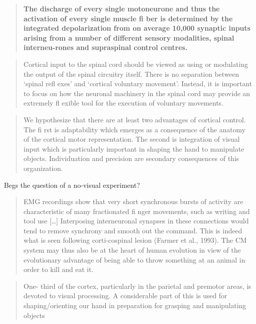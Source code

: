 \documentclass[../main.tex]{subfiles}
\begin{document}
{{{\begin{quote}
\textbf{The discharge of every single motoneurone and thus the
activation of every single muscle fi ber is determined by the integrated
depolarization from on average 10,000 synaptic inputs arising from a
number of different sensory modalities, spinal interneu-rones and
supraspinal control centres.}
\end{quote}

\begin{quote}
Cortical input to the spinal cord should be viewed as using or
modulating the output of the spinal circuitry itself. There is no
separation between `spinal refl exes' and `cortical voluntary movement'.
Instead, it is important to focus on how the neuronal machinery in the
spinal cord may provide an extremely fl exible tool for the execution of
voluntary movements.
\end{quote}

\begin{quote} 
  We hypothesize that there are at least two advantages of cortical control. The fi rst is adaptability which emerges as a consequence of the anatomy of the cortical motor representation. The second is integration of visual input which is particularly important in shaping the hand to manipulate objects. Individuation and precision are secondary consequences of this organization.
\end{quote}

Begs the question of a no-visual experiment?

\begin{quote}
  EMG recordings show that very short synchronous bursts of activity are characteristic of many fractionated fi nger movements, such as writing and tool use {[}\ldots{]} Interposing interneuronal synapses in these connections would tend to remove synchrony and smooth out the command. This is indeed what is seen following corti-cospinal lesion (Farmer et al., 1993). The CM system may thus also be at the heart of human evolution in view of the evolutionary advantage of being able to throw something at an animal in order to kill and eat it.
\end{quote}

\begin{quote} 
  One- third of the cortex, particularly in the parietal and premotor areas, is devoted to visual processing. A considerable part of this is used for shaping/orienting our hand in preparation for grasping and manipulating objects
\end{quote}

}}}
\end{document}
